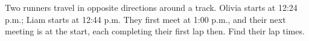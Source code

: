 Two runners travel in opposite directions around a track. Olivia starts at 12:24 p.m.; Liam starts at 12:44 p.m. They first meet at 1:00 p.m., and their next meeting is at the start, each completing their first lap then. Find their lap times.

